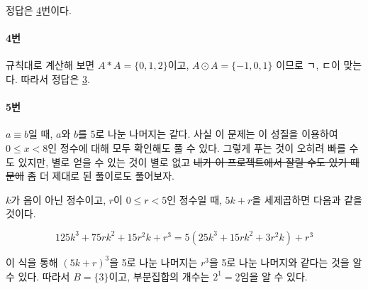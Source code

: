 \documentclass{article}
\begin{document}
정답은 \underline{4}번이다.

\paragraph{4번}
규칙대로 계산해 보면 $A * A = \{0, 1, 2\}$이고, $A \odot A = \{-1, 0, 1\}$ 이므로 ㄱ, ㄷ이 맞는다. 따라서 정답은 \underline{3}.

\paragraph{5번}
$a \equiv b$일 때, $a$와 $b$를 5로 나눈 나머지는 같다. 사실 이 문제는 이 성질을 이용하여 $0 \le x < 8$인 정수에 대해 모두 확인해도 풀 수 있다. 그렇게 푸는 것이 오히려 빠를 수도 있지만, 별로 얻을 수 있는 것이 별로 없고 \sout{내가 이 프로젝트에서 잘릴 수도 있기 때문에} 좀 더 제대로 된 풀이로도 풀어보자. \newline

$k$가 음이 아닌 정수이고, $r$이 $0 \le r < 5$인 정수일 때, $5k + r$을 세제곱하면 다음과 같을 것이다.

\[
125k^3 + 75rk^2 + 15r^{2}k + r^3 = 5(25k^3 + 15rk^2 + 3r^{2}k) + r^3
\]

이 식을 통해 $(5k + r)^3$을 5로 나눈 나머지는 $r^3$을 5로 나눈 나머지와 같다는 것을 알 수 있다. 따라서 $B = \{3\}$이고, 부분집합의 개수는 $2^1 = \underline{2}$임을 알 수 있다.
\end{document}
